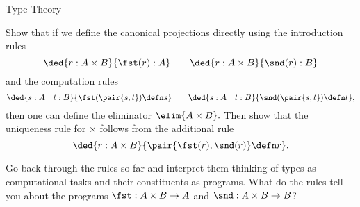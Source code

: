 \begin{unit}{Type Theory}
\begin{problem}
  Show that if we define the canonical projections directly using the introduction rules
  \[\ded{r:A \times B}{\fst(r) :A} \qquad \ded{r:A \times B}{\snd(r) :B}\]
  and the computation rules
  \[\ded{s:A \quad t: B}{\fst(\pair{s,t}) \defn s} \qquad \ded{s: A \quad t : B}{\snd(\pair{s,t}) \defn t},\]
  then one can define the eliminator \(\elim{A \times B}.\)
  Then show that the uniqueness rule for \(\times\) follows from the additional rule
  \[\ded{r : A \times B}{\pair{\fst(r),\snd(r)} \defn r}.\]
\end{problem}

\begin{problem}
  Go back through the rules so far and interpret them thinking of types as computational tasks and their constituents as programs.
  What do the rules tell you about the programs \(\fst:A \times B \to A\) and \(\snd:A \times B \to B\)?
\end{problem}

\end{unit}
\endinput
